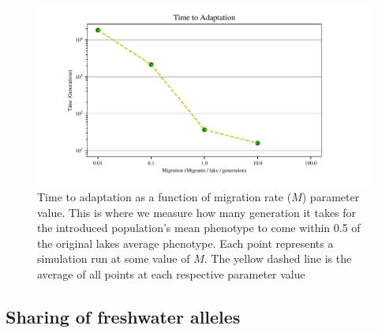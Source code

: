 \documentclass{article}
\begin{document}
\begin{figure}
	\begin{center}
  		\includegraphics{Final_Plots/Time_Adapt.pdf}
  		\caption{
		Time to adaptation as a function of migration rate ($M$) parameter value. This is where we measure how many generation
		it takes for the introduced population's mean phenotype to come within 0.5 of the original lakes average phenotype. 
		Each point represents a simulation run at some value of $M$. 
		The yellow dashed line is the average of all points at each respective parameter value}
  		\label{fig:TimeToAdaptation}
	\end{center}
\end{figure}

\subsection*{Sharing of freshwater alleles}
\end{document}
